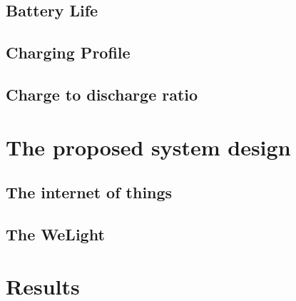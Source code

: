 \documentclass[a4paper, 10pt]{article}
\begin{document}
\subsection{Battery Life}
\label{sec:battery}


\subsection{Charging Profile}
\label{sec:charging}


\subsection{Charge to discharge ratio}
\label{sec:chargedischarge}


\section{The proposed system design}
\label{sec:proposed}



\subsection{The internet of things}
\label{sec:internet}


\subsection{The WeLight}
\label{sec:WeLight}



\section{Results}
\label{sec:results}

\end{document}

